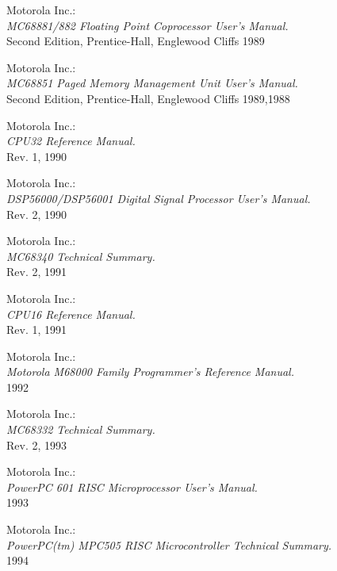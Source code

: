  Motorola Inc.: \\
                {\em MC68881/882 Floating Point Coprocessor User's
                Manual.\/} \\
                Second Edition, Prentice-Hall, Englewood Cliffs 1989

 Motorola Inc.: \\
                {\em MC68851 Paged Memory Management Unit User's
                Manual.\/} \\
                Second Edition, Prentice-Hall, Englewood Cliffs 1989,1988

 Motorola Inc.: \\
                {\em CPU32 Reference Manual.\/} \\
                Rev. 1, 1990

 Motorola Inc.: \\
                {\em DSP56000/DSP56001 Digital Signal Processor User's
                Manual.\/} \\
                Rev. 2, 1990

 Motorola Inc.: \\
                 {\em MC68340 Technical Summary.\/} \\
                 Rev. 2, 1991

 Motorola Inc.: \\
                {\em CPU16 Reference Manual.\/} \\
                Rev. 1, 1991

 Motorola Inc.: \\
                 {\em Motorola M68000 Family Programmer's
                  Reference Manual.\/} \\
                 1992

 Motorola Inc.: \\
                 {\em MC68332 Technical Summary.\/} \\
                 Rev. 2, 1993

 Motorola Inc.: \\
                 {\em PowerPC 601 RISC Microprocessor User's Manual.\/} \\
                 1993

 Motorola Inc.: \\
                 {\em PowerPC(tm) MPC505 RISC Microcontroller Technical
                 Summary.\/} \\
        	 1994

